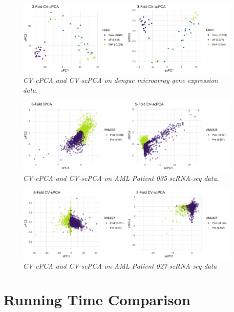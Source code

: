 \documentclass{article}
\begin{document}
\begin{figure}
    \centering
    \includegraphics[width = \textwidth]{figures/dengue_cv_results.png}
    \caption{\em{CV-cPCA and CV-scPCA on dengue microarray gene expression data.}}
    \label{fig:cv_dengue}
\end{figure}

\begin{figure}
    \centering
    \includegraphics[width = \textwidth]{figures/aml035_cv_results.png}
    \caption{\em{CV-cPCA and CV-scPCA on AML Patient 035 scRNA-seq data.}}
    \label{fig:cv_aml035}
\end{figure}

\begin{figure}
    \centering
    \includegraphics[width = \textwidth]{figures/aml027_cv_results.png}
    \caption{\em{CV-cPCA and CV-scPCA on AML Patient 027 scRNA-seq data}}
    \label{fig:cv_aml027}
\end{figure}
 
 
\section{Running Time Comparison}\label{run_time}
\end{document}

